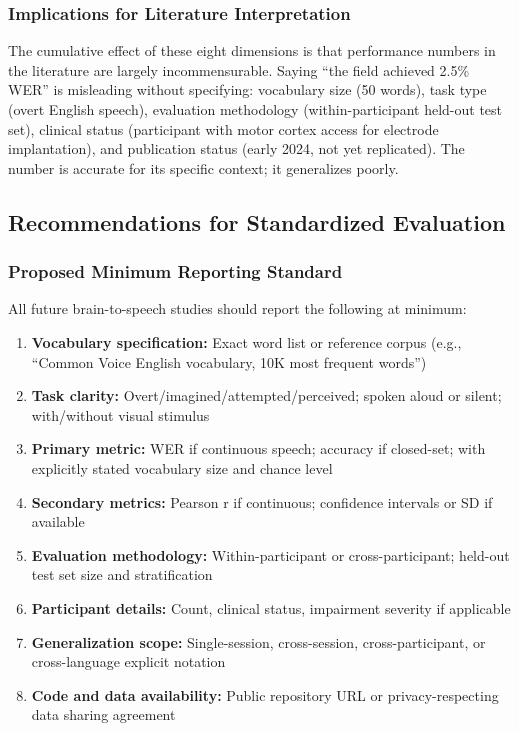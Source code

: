 \subsubsection{Implications for Literature Interpretation}

The cumulative effect of these eight dimensions is that performance numbers in the literature are largely incommensurable. Saying ``the field achieved 2.5\% WER'' is misleading without specifying: vocabulary size (50 words), task type (overt English speech), evaluation methodology (within-participant held-out test set), clinical status (participant with motor cortex access for electrode implantation), and publication status (early 2024, not yet replicated). The number is accurate for its specific context; it generalizes poorly.

\subsection{Recommendations for Standardized Evaluation}
\label{sec:standardization}

\subsubsection{Proposed Minimum Reporting Standard}

All future brain-to-speech studies should report the following at minimum:

\begin{enumerate}
    \item \textbf{Vocabulary specification:} Exact word list or reference corpus (e.g., ``Common Voice English vocabulary, 10K most frequent words'')
    \item \textbf{Task clarity:} Overt/imagined/attempted/perceived; spoken aloud or silent; with/without visual stimulus
    \item \textbf{Primary metric:} WER if continuous speech; accuracy if closed-set; with explicitly stated vocabulary size and chance level
    \item \textbf{Secondary metrics:} Pearson r if continuous; confidence intervals or SD if available
    \item \textbf{Evaluation methodology:} Within-participant or cross-participant; held-out test set size and stratification
    \item \textbf{Participant details:} Count, clinical status, impairment severity if applicable
    \item \textbf{Generalization scope:} Single-session, cross-session, cross-participant, or cross-language explicit notation
    \item \textbf{Code and data availability:} Public repository URL or privacy-respecting data sharing agreement
\end{enumerate}

